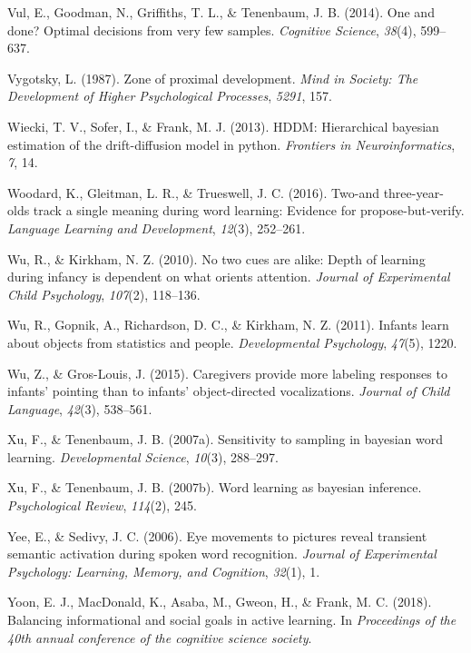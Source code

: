 \documentclass[oneside]{report}
\begin{document}
\hypertarget{ref-vul2014}{}
Vul, E., Goodman, N., Griffiths, T. L., \& Tenenbaum, J. B. (2014). One
and done? Optimal decisions from very few samples. \emph{Cognitive
Science}, \emph{38}(4), 599--637.

\hypertarget{ref-vygotsky1987zone}{}
Vygotsky, L. (1987). Zone of proximal development. \emph{Mind in
Society: The Development of Higher Psychological Processes},
\emph{5291}, 157.

\hypertarget{ref-wiecki2013hddm}{}
Wiecki, T. V., Sofer, I., \& Frank, M. J. (2013). HDDM: Hierarchical
bayesian estimation of the drift-diffusion model in python.
\emph{Frontiers in Neuroinformatics}, \emph{7}, 14.

\hypertarget{ref-woodard2016two}{}
Woodard, K., Gleitman, L. R., \& Trueswell, J. C. (2016). Two-and
three-year-olds track a single meaning during word learning: Evidence
for propose-but-verify. \emph{Language Learning and Development},
\emph{12}(3), 252--261.

\hypertarget{ref-wu2010no}{}
Wu, R., \& Kirkham, N. Z. (2010). No two cues are alike: Depth of
learning during infancy is dependent on what orients attention.
\emph{Journal of Experimental Child Psychology}, \emph{107}(2),
118--136.

\hypertarget{ref-wu2011infants}{}
Wu, R., Gopnik, A., Richardson, D. C., \& Kirkham, N. Z. (2011). Infants
learn about objects from statistics and people. \emph{Developmental
Psychology}, \emph{47}(5), 1220.

\hypertarget{ref-wu2015caregivers}{}
Wu, Z., \& Gros-Louis, J. (2015). Caregivers provide more labeling
responses to infants' pointing than to infants' object-directed
vocalizations. \emph{Journal of Child Language}, \emph{42}(3), 538--561.

\hypertarget{ref-xu2007sampling}{}
Xu, F., \& Tenenbaum, J. B. (2007a). Sensitivity to sampling in bayesian
word learning. \emph{Developmental Science}, \emph{10}(3), 288--297.

\hypertarget{ref-xu2007word}{}
Xu, F., \& Tenenbaum, J. B. (2007b). Word learning as bayesian
inference. \emph{Psychological Review}, \emph{114}(2), 245.

\hypertarget{ref-yee2006eye}{}
Yee, E., \& Sedivy, J. C. (2006). Eye movements to pictures reveal
transient semantic activation during spoken word recognition.
\emph{Journal of Experimental Psychology: Learning, Memory, and
Cognition}, \emph{32}(1), 1.

\hypertarget{ref-yoon2018balancing}{}
Yoon, E. J., MacDonald, K., Asaba, M., Gweon, H., \& Frank, M. C.
(2018). Balancing informational and social goals in active learning. In
\emph{Proceedings of the 40th annual conference of the cognitive science
society}.
\end{document}
